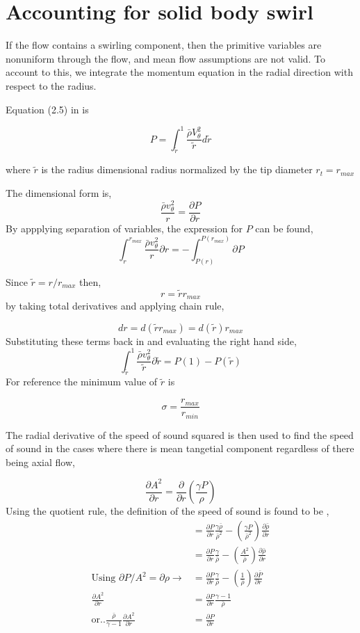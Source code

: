 \section{Accounting for solid body swirl}

If the flow contains a swirling component, then the primitive variables are 
nonuniform through the flow, and mean flow assumptions are not valid. 
To account to this, we integrate the momentum equation in the radial direction 
with respect to the radius. 

Equation (2.5) in \cite{kousen1995eigenmode} is 

\[P = \int_{\tilde{r}}^{1} \frac{\bar{\rho} V_{\theta}^2}{\tilde{r}} d\tilde{r}\] 

where $\tilde{r}$ is the radius dimensional radius normalized by the tip diameter $r_t = r_{max}$

The dimensional form is,
\[
\frac{\bar{\rho} v_{\theta}^2}{r} 
=\frac{\partial P}{\partial r}
\]
By appplying separation of variables, the expression for $P$ can be found,
\[
\int_{r}^{r_{max}} \frac{\bar{\rho} v_{\theta}^2}{r}\partial r 
=-\int_{P(r)}^{P(r_{max})}\partial P
\]

Since $\tilde{r} = r/r_{max}$ then,
\[r = \tilde{r}r_{max}\]
by taking total derivatives and applying chain rule,

\[dr = d(\tilde{r}r_{max}) = d(\tilde{r})r_{max}\]
Substituting these terms back in and evaluating the right hand side,
\[
\int_{\tilde{r}}^{1} \frac{\bar{\rho} v_{\theta}^2}{\tilde{r}}\partial \tilde{r} 
=P(1)-P(\tilde{r})
\]
For reference the minimum value of $\tilde{r}$ is

\[\sigma = \frac{r_{max}}{r_{min}}\]

The radial derivative of the speed of sound squared is then used to find the 
speed of sound in the cases where there is mean tangetial component regardless
of there being axial flow,

\[\frac{\partial A^2}{\partial r } = \frac{\partial}{\partial r} \left( \frac{\gamma P}{\rho} \right)\]
Using the quotient rule, the definition of the speed of sound is found to be ,
\begin{align*}
&= \frac{\partial P}{\partial r} \frac{\gamma \bar{\rho}}{\bar{\rho}^2} - \left( \frac{\gamma P}{\bar{\rho}^2} \right) \frac{\partial \bar{\rho}}{\partial r}\\
&=  \frac{\partial P}{\partial r} \frac{\gamma }{\bar{\rho}} - \left( \frac{A^2}{\bar{\rho}} \right) \frac{\partial \bar{\rho} }{\partial r}\\ \text{Using } \partial P/A^2 = \partial \rho \rightarrow &= \frac{\partial P}{\partial r} \frac{\gamma }{\bar{\rho}} - \left( \frac{1}{\bar{\rho}} \right) \frac{\partial \bar{ P} }{\partial r}\\
\frac{\partial A^2}{\partial r} &= \frac{\partial P}{\partial r} \frac{\gamma - 1}{\bar{\rho}}  \\ \text{or..}
\frac{\bar{\rho}}{\gamma -1}\frac{\partial A^2}{\partial r} &= \frac{\partial P}{\partial r} 
\end{align*}


